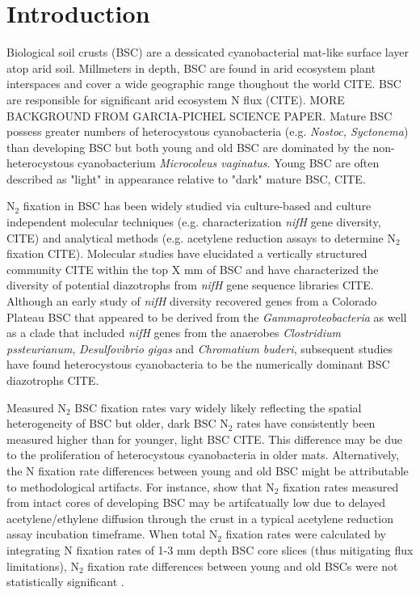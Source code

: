 \section{Introduction}


Biological soil crusts (BSC) are a dessicated cyanobacterial mat-like surface layer atop arid soil. Millmeters in depth, BSC are found in arid ecosystem plant interspaces and cover a wide geographic range thoughout the world CITE. BSC are responsible for significant arid ecosystem N flux (CITE). MORE BACKGROUND FROM GARCIA-PICHEL SCIENCE PAPER. Mature BSC possess greater numbers of heterocystous cyanobacteria (e.g. \textit{Nostoc, Syctonema}) than developing BSC but both young and old BSC are dominated by the non-heterocystous cyanobacterium \textit{Microcoleus vaginatus}. Young BSC are often described as "light" in appearance relative to "dark" mature BSC, CITE.

N$_{2}$ fixation in BSC has been widely studied via culture-based and culture independent molecular techniques (e.g. characterization \textit{nifH} gene diversity, CITE) and analytical methods (e.g. acetylene reduction assays to determine N$_{2}$ fixation CITE). Molecular studies have elucidated a vertically structured community CITE within the top X mm of BSC and have characterized the diversity of potential diazotrophs from \textit{nifH} gene sequence libraries CITE. Although an early study of \textit{nifH} diversity recovered genes from a Colorado Plateau BSC that appeared to be derived from the \textit{Gammaproteobacteria} as well as a clade that included \textit{nifH} genes from the anaerobes \textit{Clostridium pssteurianum}, \textit{Desulfovibrio gigas} and \textit{Chromatium buderi}, subsequent studies have found heterocystous cyanobacteria to be the numerically dominant BSC diazotrophs CITE. 

Measured N$_{2}$ BSC fixation rates vary widely likely reflecting the spatial heterogeneity of BSC but older, dark BSC N$_{2}$ rates have consistently been measured higher than for younger, light BSC CITE. This difference may be due to the proliferation of heterocystous cyanobacteria in older mats. Alternatively, the N fixation rate differences between young and old BSC might be attributable to methodological artifacts. For instance, \citet{15643930} show that N$_{2}$ fixation rates measured from intact cores of developing BSC may be artifcatually low due to delayed acetylene/ethylene diffusion through the crust in a typical acetylene reduction assay incubation timeframe. When total N$_{2}$ fixation rates were calculated by integrating N fixation rates of 1-3 mm depth BSC core slices (thus mitigating flux limitations), N$_{2}$ fixation rate differences between young and old BSCs were not statistically significant \cite{15643930}.

